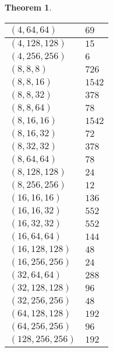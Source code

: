 \documentclass{dcthesis}
\newcommand{\mm}[1]{{\color{blue} \sf MM: [#1]}}
\numberwithin{equation}{section}
\newtheorem{theorem}[equation]{Theorem}
\theoremstyle{definition}
\newtheorem{alg}[equation]{Algorithm}
\theoremstyle{remark}
\begin{document}
{{\begin{theorem}
\begin{longtable}{|l|l|}
        $(4,64,64)$ & $69$ \\ \hline
        $(4,128,128)$ & $15$ \\ \hline
        $(4,256,256)$ & $6$ \\ \hline
        $(8,8,8)$ & $726$ \\ \hline
        $(8,8,16)$ & $1542$ \\ \hline
        $(8,8,32)$ & $378$ \\ \hline
        $(8,8,64)$ & $78$ \\ \hline
        $(8,16,16)$ & $1542$ \\ \hline
        $(8,16,32)$ & $72$ \\ \hline
        $(8,32,32)$ & $378$ \\ \hline
        $(8,64,64)$ & $78$ \\ \hline
        $(8,128,128)$ & $24$ \\ \hline
        $(8,256,256)$ & $12$ \\ \hline
        $(16,16,16)$ & $136$ \\ \hline
        $(16,16,32)$ & $552$ \\ \hline
        $(16,32,32)$ & $552$ \\ \hline
        $(16,64,64)$ & $144$ \\ \hline
        $(16,128,128)$ & $48$ \\ \hline
        $(16,256,256)$ & $24$ \\ \hline
        $(32,64,64)$ & $288$ \\ \hline
        $(32,128,128)$ & $96$ \\ \hline
        $(32,256,256)$ & $48$ \\ \hline
        $(64,128,128)$ & $192$ \\ \hline
        $(64,256,256)$ & $96$ \\ \hline
        $(128,256,256)$ & $192$ \\ \hline
      \end{longtable}
    \end{theorem}
}}
\end{document}
